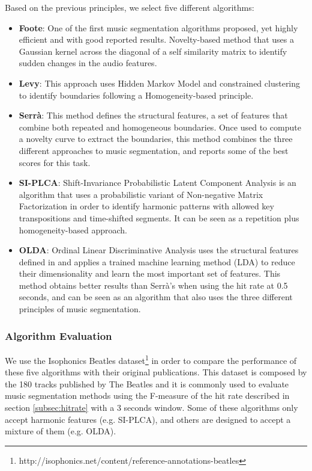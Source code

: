 \documentclass{article}
\begin{document}
Based on the previous principles, we select five different algorithms:

\begin{itemize}
  \item
    \textbf{Foote}: One of the first music segmentation algorithms proposed, yet highly efficient and with good reported results\cite{Foote1999}. Novelty-based method that uses a Gaussian kernel across the diagonal of a self similarity matrix to identify sudden changes in the audio features.
  \item
    \textbf{Levy}: This approach uses Hidden Markov Model and constrained clustering to identify boundaries following a Homogeneity-based principle\cite{Levy2008}.
  \item
    \textbf{Serr\`a}: This method defines the structural features, a set of features that combine both repeated and homogeneous boundaries. Once used to compute a novelty curve to extract the boundaries, this method combines the three different approaches to music segmentation, and reports some of the best scores for this task\cite{Serra2013}.
  \item
    \textbf{SI-PLCA}: Shift-Invariance Probabilistic Latent Component Analysis is an algorithm that uses a probabilistic variant of Non-negative Matrix Factorization in order to identify harmonic patterns with allowed key transpositions and time-shifted segments\cite{Weiss2011}. It can be seen as a repetition plus homogeneity-based approach.
  \item 
    \textbf{OLDA}: Ordinal Linear Discriminative Analysis uses the structural features defined in \cite{Serra2013} and applies a trained machine learning method (LDA) to reduce their dimensionality and learn the most important set of features\cite{McFee2014}. This method obtains better results than Serr\`a's when using the hit rate at 0.5 seconds, and can be seen as an algorithm that also uses the three different principles of music segmentation.
\end{itemize}

\subsubsection{Algorithm Evaluation}

We use the Isophonics Beatles dataset\footnote{http://isophonics.net/content/reference-annotations-beatles} in order to compare the performance of these five algorithms with their original publications. 
This dataset is composed by the 180 tracks published by The Beatles and it is commonly used to evaluate music segmentation methods using the F-measure of the hit rate described in section \ref{subsec:hitrate} with a 3 seconds window.
Some of these algorithms only accept harmonic features (e.g. SI-PLCA), and others are designed to accept a mixture of them (e.g. OLDA).
\end{document}
